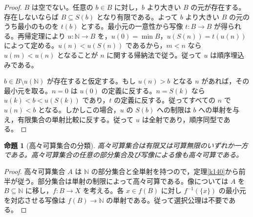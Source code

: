 \documentclass[a5paper,10pt,dvipdfmx]{jsarticle}
\theoremstyle{definition}
\theoremstyle{plain}
\newtheorem{prop}[ruledef]{命題}
\begin{document}
\begin{proof}
$B$ は空でない。任意の $b\in B$ に対し，$b$ より大きい $B$ の元が存在する。存在しないならば $B\subseteq S(b)$ となり有限である。よって $b$ より大きい $B$ の元のうち最小のものを $t(b)$ とする。最小元の一意性から写像 $t\colon B\to B$ が得られる。再帰定理により $u\colon\mathbb N\to B$ を，$u(0)=\min B$，$u(S(n))=t(u(n))$ によって定める。$u(n)<u(S(n))$ であるから，$m<n$ なら $u(m)<u(n)$ となることが $n$ に関する帰納法で従う。従って $u$ は順序埋込みである。

$b\in B\setminus u(\mathbb N)$ が存在すると仮定する。もし $u(n)>b$ となる $n$ があれば，その最小元を取る。$n=0$ は $u(0)$ の定義に反する。$n=S(k)$ なら $u(k)<b<u(S(k))$ であり，$t$ の定義に反する。従ってすべての $n$ で $u(n)<b$ となる。しかしこの場合，$u$ の $S(b)$ への制限は $b$ への単射を与え，有限集合の単射比較に反する。従って $u$ は全射であり，順序同型である。
\end{proof}
\begin{prop}[高々可算集合の分類]\label{k141}
高々可算集合は有限又は可算無限のいずれか一方である。高々可算集合の任意の部分集合及び写像による像も高々可算である。
\end{prop}
\begin{proof}
高々可算集合 $A$ は $\mathbb N$ の部分集合と全単射を持つので，定理\ref{k140}から前半が従う。部分集合は単射の制限によって高々可算である。像については $A$ を $B\subseteq\mathbb N$ に移し，$f\colon B\to X$ を考える。各 $x\in f(B)$ に対し $f^{-1}(\{x\})$ の最小元を対応させる写像は $f(B)\to\mathbb N$ の単射である。従って選択公理は不要である。
\end{proof}
\end{document}
